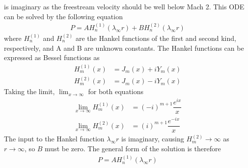 \documentclass[onecolumn,10pt]{jhwhw}
\begin{document}
is imaginary as the freestream velocity should be well below Mach 2. This ODE can be solved by the following equation
\begin{align*}
P = A H_n^{(1)} (\lambda_{\infty} r) + B H_n^{(2)} (\lambda_{\infty} r)
\end{align*}
where $H_n^{(1)}$ and $H_n^{(2)}$ are the Hankel functions of the first and second kind, respectively, and A and B are unknown constants. The Hankel functions can be expressed as Bessel functions as
\begin{align*}
H_m^{(1)}(x) &= J_m(x) + i Y_m(x) \\
H_m^{(2)}(x) &= J_m(x) - i Y_m(x)
\end{align*}
Taking the limit, $\lim_{x\to\infty}$ for both equations
\begin{align*}
\lim_{x\to\infty} H_m^{(1)}(x) &= (-i)^{m+1} \dfrac{e^{ix}}{x} \\
\lim_{x\to\infty} H_m^{(2)}(x) &= (i)^{m+1} \dfrac{e^{-ix}}{x}
\end{align*}
The input to the Hankel function $\lambda_{\infty} r$ is imaginary, causing $H_m^{(2)}\to\infty$ as $r\to\infty$, so $B$ must be zero. The general form of the solution is therefore
\begin{align*}
P = A H_n^{(1)} (\lambda_{\infty} r)
\end{align*}
\end{document}
